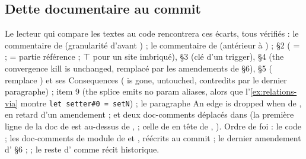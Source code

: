 \subsection{Dette documentaire au commit \snapshotCommit}

Le lecteur qui compare les textes au code rencontrera ces écarts, tous vérifiés : le commentaire de  (granularité d'avant ) ; le commentaire de  (antérieur à ) ;  §2 ( =  ;  = partie référence ; ⊤ pour un site imbriqué), §3 (clé d'un trigger), §4 (\og the convergence kill is unchanged\fg{}, remplacé par les amendements de §6), §5 ( remplace ) et ses \og Consequences\fg{} ( \og is gone\fg{},  \og untouched\fg{}, contredits par le dernier paragraphe) ;  item 9 (\og the splice emits no param aliases\fg{}, alors que l'\cref{ex:relations-via} montre \texttt{let setter\#0 = setN}) ; le paragraphe \og An edge is dropped when\fg{} de , en retard d'un amendement ; et deux doc-comments déplacés dans  (la première ligne de la doc de  est au-dessus de ,  ; celle de  en tête de , ). Ordre de foi : le code ; les doc-comments de module de  et , réécrits au commit \snapshotCommit ; le dernier amendement d' §6 ;  ; le reste d' comme récit historique.


